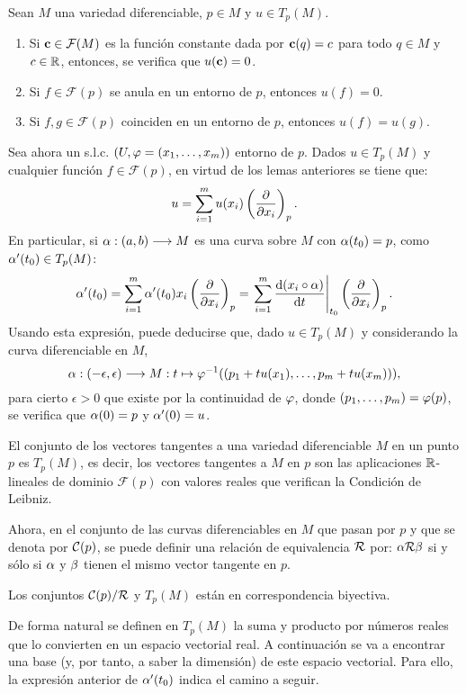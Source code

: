 \documentclass[cursovd_portada.tex]{subfiles}
\begin{document}
\begin{lemma} Sean $M$ una variedad diferenciable, $p\in M$ y $u\in T_p(M)$.
\begin{enumerate}
\item Si ${\bf c}\in{\cal F}(M)$ es la función constante dada por ${\bf c}(q)=c$ para todo $q\in M$ y $c\in\mathbb{R}$,
entonces, se verifica que $u({\bf c})=0$.
\item Si $f\in\mathcal{F}(p)$ se anula en un entorno de $p$, entonces $u(f)=0$.
\item Si $f,g\in\mathcal{F}(p)$ coinciden en un entorno de $p$, entonces $u(f)=u(g)$.
\end{enumerate}
\end{lemma}
Sea ahora un s.l.c. $(U,\varphi=(x_1,\dots ,x_m))$ entorno de $p$. Dados $u\in T_p(M)$ y cualquier función
$f\in\mathcal{F}(p)$, en virtud de los lemas anteriores se tiene que:
$$u=\sum_{i=1}^mu(x_i)\left(\displaystyle{\frac{\partial}{\partial x_i}}\right)_p.$$
\hs En particular, si $\alpha:(a,b)\longrightarrow M$ es una curva sobre $M$ con $\alpha(t_0)=p$, como $\alpha'(t_0)\in T_p(M)$:
$$\alpha'(t_0)=\sum_{i=1}^m\alpha'(t_0)x_i\left(\displaystyle{\frac{\partial}{\partial x_i}}\right)_p=
\left.\sum_{i=1}^m\displaystyle{\frac{{\rm d} (x_i\circ\alpha)}{{\rm d} t}}\right|_{t_0}\left(\displaystyle{\frac{\partial}{\partial x_i}}\right)_p.$$ \hs Usando esta expresión, puede
deducirse que, dado $u\in T_p(M)$ y considerando la curva diferenciable en $M$,
$$\alpha:(-\epsilon,\epsilon)\longrightarrow M:t\mapsto \varphi^{-1}((p_1+tu(x_1),\dots ,p_m+tu(x_m))),$$
para cierto $\epsilon>0$ que existe por la continuidad de $\varphi$, donde $(p_1,\dots ,p_m)=\varphi(p)$, se verifica que
$\alpha(0)=p$ y $\alpha'(0)=u$.
\begin{teorema}
El conjunto de los vectores tangentes a una variedad diferenciable $M$ en un punto $p$ es $T_p(M)$, es decir, los
vectores tangentes a $M$ en $p$ son las aplicaciones $\mathbb{R}$-lineales de dominio $\mathcal{F}(p)$ con valores reales
que verifican la Condición de Leibniz.
\end{teorema}
Ahora, en el conjunto de las curvas diferenciables en $M$ que pasan por $p$ y que se denota por ${\cal C}(p)$, se
puede definir una relación de equivalencia ${\cal R}$ por: $\alpha{\cal R}\beta$ si y sólo si $\alpha$ y $\beta$ tienen el mismo
vector tangente en $p$.
\begin{prop}
Los conjuntos ${\cal C}(p)/{\cal R}$ y $T_p(M)$ están en correspondencia biyectiva.
\end{prop}
De forma natural se definen en $T_p(M)$ la suma y producto por
números reales que lo convierten en un espacio vectorial real.
A continuación se va a encontrar una base (y, por tanto, a
saber la dimensión) de este espacio vectorial. Para ello, la
expresión anterior de $\alpha'(t_0)$ indica el camino a seguir.
\end{document}
